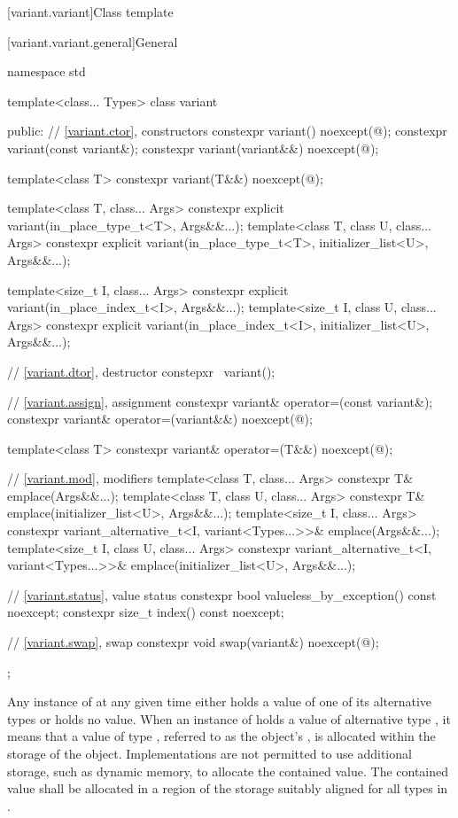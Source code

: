 [variant.variant]{Class template }%
%

[variant.variant.general]{General}

\begin{codeblock}
namespace std {
  template<class... Types>
  class variant {
  public:
    // \ref{variant.ctor}, constructors
    constexpr variant() noexcept(@\seebelow@);
    constexpr variant(const variant&);
    constexpr variant(variant&&) noexcept(@\seebelow@);

    template<class T>
      constexpr variant(T&&) noexcept(@\seebelow@);

    template<class T, class... Args>
      constexpr explicit variant(in_place_type_t<T>, Args&&...);
    template<class T, class U, class... Args>
      constexpr explicit variant(in_place_type_t<T>, initializer_list<U>, Args&&...);

    template<size_t I, class... Args>
      constexpr explicit variant(in_place_index_t<I>, Args&&...);
    template<size_t I, class U, class... Args>
      constexpr explicit variant(in_place_index_t<I>, initializer_list<U>, Args&&...);

    // \ref{variant.dtor}, destructor
    constepxr ~variant();

    // \ref{variant.assign}, assignment
    constexpr variant& operator=(const variant&);
    constexpr variant& operator=(variant&&) noexcept(@\seebelow@);

    template<class T> constexpr variant& operator=(T&&) noexcept(@\seebelow@);

    // \ref{variant.mod}, modifiers
    template<class T, class... Args>
      constexpr T& emplace(Args&&...);
    template<class T, class U, class... Args>
      constexpr T& emplace(initializer_list<U>, Args&&...);
    template<size_t I, class... Args>
      constexpr variant_alternative_t<I, variant<Types...>>& emplace(Args&&...);
    template<size_t I, class U, class... Args>
      constexpr variant_alternative_t<I, variant<Types...>>&
        emplace(initializer_list<U>, Args&&...);

    // \ref{variant.status}, value status
    constexpr bool valueless_by_exception() const noexcept;
    constexpr size_t index() const noexcept;

    // \ref{variant.swap}, swap
    constexpr void swap(variant&) noexcept(@\seebelow@);
  };
}
\end{codeblock}

\pnum
Any instance of  at any given time either holds a value
of one of its alternative types or holds no value.
When an instance of  holds a value of alternative type ,
it means that a value of type , referred to as the 
object's , is allocated within the storage of the
 object.
Implementations are not permitted to use additional storage, such as dynamic
memory, to allocate the contained value.
The contained value shall be allocated in a region of the 
storage suitably aligned for all types in .

